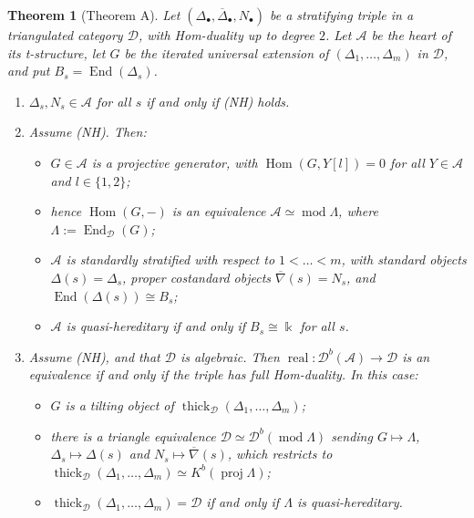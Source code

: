 \documentclass[11pt,reqno]{amsart}
\theoremstyle{plain}
\newtheorem{theorem}{Theorem}[section]
\theoremstyle{definition}
\theoremstyle{remark}
\newcommand{\kk}{\Bbbk}
\DeclareMathOperator{\Hom}{Hom}
\DeclareMathOperator{\End}{End}
\DeclareMathOperator{\real}{real}
\newcommand{\modd}{\operatorname{mod}}
\newcommand{\proj}{\operatorname{proj}}
\newcommand{\Db}{\mathcal{D}^b}
\newcommand{\Kb}{K^b}
\newcommand{\thick}[2][\cD]{\operatorname{thick}_{#1}(#2)}
\newcommand{\nablabar}{\overline{\nabla}}
\newcommand{\Deltabar}{\overline{\Delta}}
\newcommand{\cD}{\mathcal{D}}
\newcommand{\cA}{\mathcal{A}}
\begin{document}
\begin{theorem}[Theorem A]\label{thm:A}
Let $(\Delta_\bullet,\Deltabar_\bullet,N_\bullet)$ be a stratifying triple in a triangulated category $\cD$, with Hom-duality up to degree $2$. Let $\cA$ be the heart of its t-structure, let $G$ be the iterated universal extension of $(\Delta_1,\dots,\Delta_m)$ in $\cD$, and put $B_s=\End(\Delta_s)$.
\begin{enumerate}
\item $\Delta_s,N_s\in\cA$ for all $s$ if and only if (NH) holds.
\item Assume (NH). Then:
\begin{itemize}
\item $G\in\cA$ is a projective generator, with $\Hom(G,Y[l])=0$ for all $Y\in\cA$ and $l\in\{1,2\}$;
\item hence $\Hom(G,-)$ is an equivalence $\cA\simeq\modd\Lambda$, where $\Lambda:=\End_\cD(G)$;
\item $\cA$ is standardly stratified with respect to $1<\dots<m$, with standard objects $\Delta(s)=\Delta_s$, proper costandard objects $\nablabar(s)=N_s$, and $\End(\Delta(s))\cong B_s$;
\item $\cA$ is quasi-hereditary if and only if $B_s\cong\kk$ for all $s$.
\end{itemize}
\item Assume (NH), and that $\cD$ is algebraic. Then $\real\colon\Db(\cA)\to\cD$ is an equivalence if and only if the triple has full Hom-duality. In this case:
\begin{itemize}
\item $G$ is a tilting object of $\thick{\Delta_1,\dots,\Delta_m}$;
\item there is a triangle equivalence $\cD\simeq\Db(\modd\Lambda)$ sending $G\mapsto\Lambda$, $\Delta_s\mapsto\Delta(s)$ and $N_s\mapsto\nablabar(s)$, which restricts to $\thick{\Delta_1,\dots,\Delta_m}\simeq\Kb(\proj\Lambda)$;
\item $\thick{\Delta_1,\dots,\Delta_m}=\cD$ if and only if $\Lambda$ is quasi-hereditary.
\end{itemize}
\end{enumerate}
\end{theorem}
\end{document}
